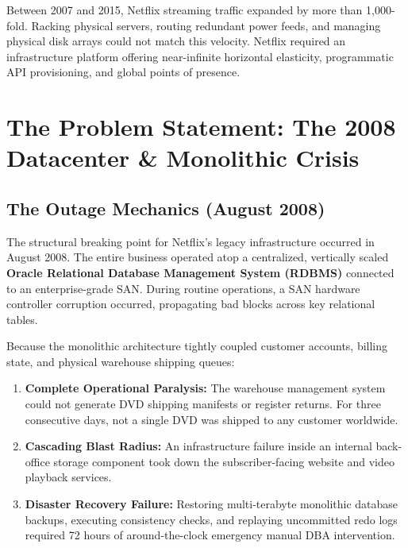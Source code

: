 \documentclass[11pt,a4paper]{article}
\begin{document}
Between 2007 and 2015, Netflix streaming traffic expanded by more than 1,000-fold. Racking physical servers, routing redundant power feeds, and managing physical disk arrays could not match this velocity. Netflix required an infrastructure platform offering near-infinite horizontal elasticity, programmatic API provisioning, and global points of presence.

\section{The Problem Statement: The 2008 Datacenter \& Monolithic Crisis}

\subsection{The Outage Mechanics (August 2008)}
The structural breaking point for Netflix's legacy infrastructure occurred in August 2008. The entire business operated atop a centralized, vertically scaled \textbf{Oracle Relational Database Management System (RDBMS)} connected to an enterprise-grade SAN. During routine operations, a SAN hardware controller corruption occurred, propagating bad blocks across key relational tables. 

Because the monolithic architecture tightly coupled customer accounts, billing state, and physical warehouse shipping queues:
\begin{enumerate}[leftmargin=*]
    \item \textbf{Complete Operational Paralysis:} The warehouse management system could not generate DVD shipping manifests or register returns. For three consecutive days, not a single DVD was shipped to any customer worldwide.
    \item \textbf{Cascading Blast Radius:} An infrastructure failure inside an internal back-office storage component took down the subscriber-facing website and video playback services.
    \item \textbf{Disaster Recovery Failure:} Restoring multi-terabyte monolithic database backups, executing consistency checks, and replaying uncommitted redo logs required 72 hours of around-the-clock emergency manual DBA intervention.
\end{enumerate}
\end{document}
